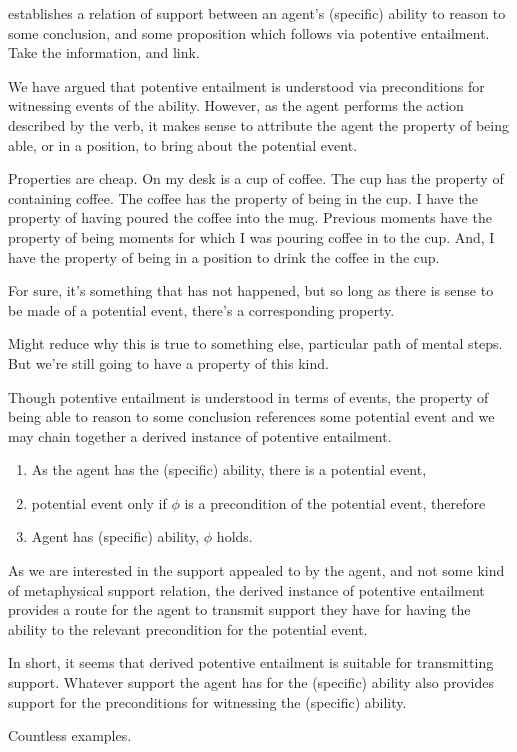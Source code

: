 \begin{note}[Attribution]
  \AR{} establishes a relation of support between an agent's (specific) ability to reason to some conclusion, and some proposition which follows via potentive entailment.
  Take the information, and link.

  We have argued that potentive entailment is understood via preconditions for witnessing events of the ability.
  However, as the agent performs the action described by the verb, it makes sense to attribute the agent the property of being able, or in a position, to bring about the potential event.

  Properties are cheap.
  On my desk is a cup of coffee.
  The cup has the property of containing coffee.
  The coffee has the property of being in the cup.
  I have the property of having poured the coffee into the mug.
  Previous moments have the property of being moments for which I was pouring coffee in to the cup.
  And, I have the property of being in a position to drink the coffee in the cup.

  For sure, it's something that has not happened, but so long as there is sense to be made of a potential event, there's a corresponding property.

  Might reduce why this is true to something else, particular path of mental steps.
  But we're still going to have a property of this kind.

  Though potentive entailment is understood in terms of events, the property of being able to reason to some conclusion references some potential event and we may chain together a derived instance of potentive entailment.
  \begin{enumerate}
  \item As the agent has the (specific) ability, there is a potential event,
  \item potential event only if \(\phi\) is a precondition of the potential event, therefore
  \item Agent has (specific) ability, \(\phi\) holds.
  \end{enumerate}
  As we are interested in the support appealed to by the agent, and not {\color{red} some kind of metaphysical} support relation, the derived instance of potentive entailment provides a route for the agent to transmit support they have for having the ability to the relevant precondition for the potential event.

  In short, it seems that derived potentive entailment is suitable for transmitting support.
  Whatever support the agent has for the (specific) ability also provides support for the preconditions for witnessing the (specific) ability.

  

  Countless examples.
\end{note}

